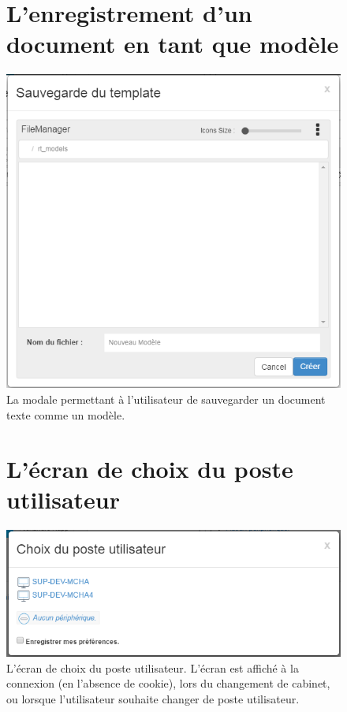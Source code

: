 \begin{appendices}
\begin{figure}[H]
	\section*{L'enregistrement d'un document en tant que modèle}
	\centering
	\includegraphics[width=16cm]{./img/save_template}
	\caption{\label{fig:editeur_template} La modale permettant à l'utilisateur de sauvegarder un document texte comme un modèle.}
\end{figure}

\newpage
\begin{figure}[H]
	\section*{L'écran de choix du poste utilisateur}
	\centering
	\includegraphics[width=16cm]{./img/device}
	\caption{\label{fig:device} L'écran de choix du poste utilisateur. L'écran est affiché à la connexion (en l'absence de cookie), lors du changement de cabinet, ou lorsque l'utilisateur souhaite changer de poste utilisateur.}
\end{figure}


\end{appendices}
